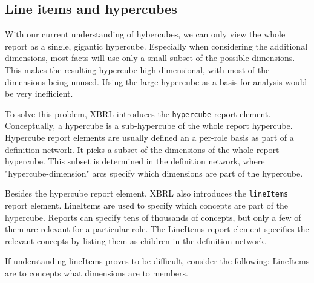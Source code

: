 \subsection{Line items and hypercubes}

With our current understanding of hybercubes, we can only view the whole report as a single, gigantic hypercube.
Especially when considering the additional dimensions, most facts will use only a small subset of the possible dimensions.
This makes the resulting hypercube high dimensional, with most of the dimensions being unused.
Using the large hypercube as a basis for analysis would be very inefficient.

To solve this problem, XBRL introduces the \texttt{hypercube} report element.
Conceptually, a hypercube is a sub-hypercube of the whole report hypercube.
Hypercube report elements are usually defined an a per-role basis as part of a definition network.
It picks a subset of the dimensions of the whole report hypercube.
This subset is determined in the definition network, where "hypercube-dimension" arcs specify which dimensions are part of the hypercube.

Besides the hypercube report element, XBRL also introduces the \texttt{lineItems} report element.
LineItems are used to specify which concepts are part of the hypercube.
Reports can specify tens of thousands of concepts, but only a few of them are relevant for a particular role.
The LineItems report element specifies the relevant concepts by listing them as children in the definition network.

If understanding lineItems proves to be difficult, consider the following: 
LineItems are to concepts what dimensions are to members.


